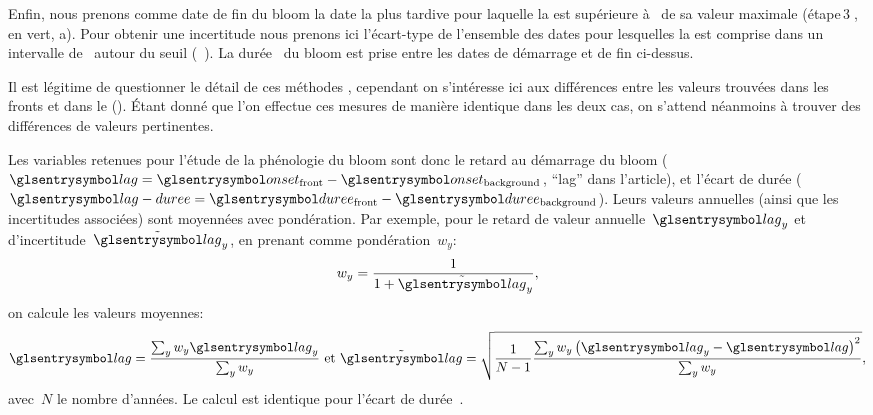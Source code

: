 \begin{figure}
  \centering
  \label{fig:bloom-lag}
\end{figure}

Enfin, nous prenons comme date de fin du bloom la date la plus tardive pour laquelle la  est supérieure à~ de sa valeur maximale (étape\,\textcircled{3}, en vert, a).
Pour obtenir une incertitude nous prenons ici l'écart-type de l'ensemble des dates pour lesquelles la  est comprise dans un intervalle de~ autour du seuil (~).
La durée~ du bloom est prise entre les dates de démarrage et de fin ci-dessus.

Il est légitime de questionner le détail de ces méthodes , cependant on s'intéresse ici aux différences entre les valeurs trouvées dans les fronts et dans le  ().
Étant donné que l'on effectue ces mesures de manière identique dans les deux cas, on s'attend néanmoins à trouver des différences de valeurs pertinentes.

Les variables retenues pour l'étude de la phénologie du bloom sont donc le retard au démarrage du bloom (\(\am{lag} = \am{onset}_\frt - \am{onset}_\bkg \), \enquote{lag} dans l'article), et l'écart de durée (\(\am{lag-duree} = \am{duree}_\frt - \am{duree}_\bkg\)).
Leurs valeurs annuelles (ainsi que les incertitudes associées) sont moyennées avec pondération.
Par exemple, pour le retard de valeur annuelle~\(\am{lag}_y\) et d'incertitude~\(\err{\am{lag}}_y\), en prenant comme pondération~\(w_y\):
\begin{equation}
  w_y = \frac 1 {1 + \err{\am{lag}}_y} ,
\end{equation}
on calcule les valeurs moyennes:
\begin{equation}
  \am{lag} = \frac {\sum_y w_y \am{lag}_y} {\sum_y w_y}
  \text{ et }
  \err{\am{lag}} = \sqrt{ \frac1{N-1} \frac {\sum_y w_y \paren{\am{lag}_y - \am{lag}}^2 } {\sum_y w_y} },
\end{equation}
avec~\(N\) le nombre d'années.
Le calcul est identique pour l'écart de durée~.

